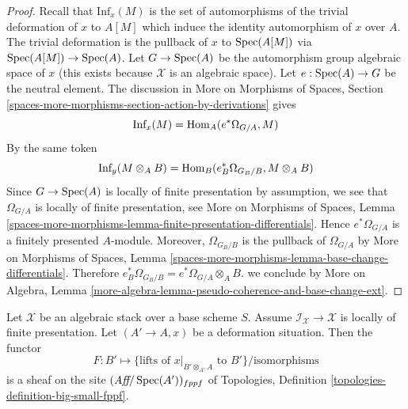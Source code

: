 \begin{proof}
Recall that $\text{Inf}_x(M)$ is the set of automorphisms of the
trivial deformation of $x$ to $A[M]$ which induce the identity
automorphism of $x$ over $A$. The trivial deformation is
the pullback of $x$ to $\mathop{\mathrm{Spec}}(A[M])$ via $\mathop{\mathrm{Spec}}(A[M]) \to \mathop{\mathrm{Spec}}(A)$.
Let $G \to \mathop{\mathrm{Spec}}(A)$ be the automorphism group algebraic space of $x$
(this exists because $\mathcal{X}$ is an algebraic space).
Let $e : \mathop{\mathrm{Spec}}(A) \to G$ be the neutral element.
The discussion in More on Morphisms of Spaces, Section
\ref{spaces-more-morphisms-section-action-by-derivations}
gives
$$
\text{Inf}_x(M) = \mathop{\mathrm{Hom}}\nolimits_A(e^*\Omega_{G/A}, M)
$$
By the same token
$$
\text{Inf}_y(M \otimes_A B) = \mathop{\mathrm{Hom}}\nolimits_B(e_B^*\Omega_{G_B/B}, M \otimes_A B)
$$
Since $G \to \mathop{\mathrm{Spec}}(A)$ is locally of finite presentation by
assumption, we see that $\Omega_{G/A}$ is locally of finite
presentation, see
More on Morphisms of Spaces, Lemma
\ref{spaces-more-morphisms-lemma-finite-presentation-differentials}.
Hence $e^*\Omega_{G/A}$ is a finitely presented $A$-module.
Moreover, $\Omega_{G_B/B}$ is the pullback of $\Omega_{G/A}$ by
More on Morphisms of Spaces, Lemma
\ref{spaces-more-morphisms-lemma-base-change-differentials}.
Therefore $e_B^*\Omega_{G_B/B} = e^*\Omega_{G/A} \otimes_A B$.
we conclude by More on Algebra, Lemma
\ref{more-algebra-lemma-pseudo-coherence-and-base-change-ext}.
\end{proof}

\begin{lemma}
\label{lemma-sheaf-of-infinitesimal-lifts}
Let $\mathcal{X}$ be an algebraic stack over a base scheme $S$.
Assume $\mathcal{I}_\mathcal{X} \to \mathcal{X}$ is locally
of finite presentation. Let $(A' \to A, x)$ be a deformation situation.
Then the functor
$$
F : B' \longmapsto
\{\text{lifts of }x|_{B' \otimes_{A'} A}\text{ to } B'\}/\text{isomorphisms}
$$
is a sheaf on the site $(\textit{Aff}/\mathop{\mathrm{Spec}}(A'))_{fppf}$ of
Topologies, Definition \ref{topologies-definition-big-small-fppf}.
\end{lemma}

